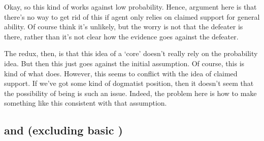 \begin{note}
  Okay, so this kind of works against low probability.
  Hence, argument here is that there's no way to get rid of this \expec{} if agent only relies on claimed support for general ability.
  Of course think it's unlikely, but the worry is not that the defeater is there, rather than it's not clear how the evidence goes against the defeater.

  The redux, then, is that this idea of a `core' doesn't really rely on the probability idea.
  But then this just goes against the initial assumption.
  Of course, this is kind of what \citeauthor{Pryor:2000tl} does.
  However, this seems to conflict with the idea of claimed support.
  If we've got some kind of dogmatist position, then it doesn't seem that the possibility of being \mom{} is such an issue.
  Indeed, the problem here is how to make something like this consistent with that assumption.
\end{note}

\subsection{\nI{} and \adB{} (excluding basic \AR{})}
\label{sec:ni-ability:adB}

